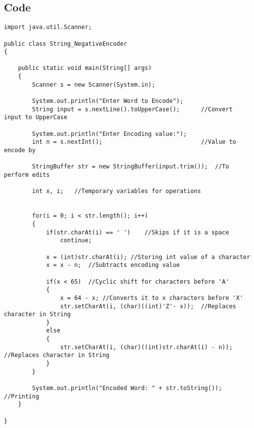 \documentclass[ProgramminAssignment.tex]{subfiles}
\begin{document}
\subsection{Code}
\begin{lstlisting}
import java.util.Scanner;

public class String_NegativeEncoder
{

	public static void main(String[] args)
	{
		Scanner s = new Scanner(System.in);
		
		System.out.println("Enter Word to Encode");
		String input = s.nextLine().toUpperCase();		//Convert input to UpperCase
		
		System.out.println("Enter Encoding value:");
		int n = s.nextInt();							//Value to encode by
		
		StringBuffer str = new StringBuffer(input.trim());	//To perform edits
		
		int x, i;	//Temporary variables for operations
		
		
		for(i = 0; i < str.length(); i++)
		{
			if(str.charAt(i) == ' ')	//Skips if it is a space
				continue;
			
			x = (int)str.charAt(i);	//Storing int value of a character
			x = x - n;	//Subtracts encoding value
			
			if(x < 65)	//Cyclic shift for characters before 'A'
			{
				x = 64 - x;	//Converts it to x characters before 'X'
				str.setCharAt(i, (char)((int)'Z'- x));	//Replaces character in String
			}
			else
			{
				str.setCharAt(i, (char)((int)str.charAt(i) - n));	//Replaces character in String
			}
		}
		
		System.out.println("Encoded Word: " + str.toString());	//Printing
	}

}

\end{lstlisting}
\end{document}
